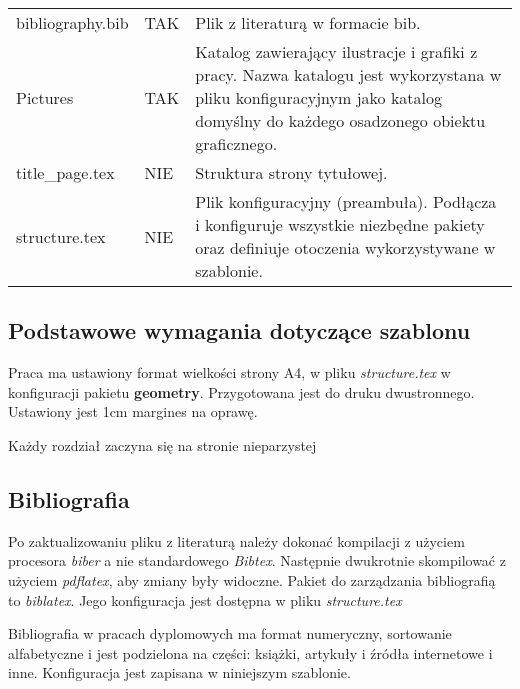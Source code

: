 \begin{table}[h]
\begin{tabular}{p{}|p{} | p{}}
        bibliography.bib     & TAK             & Plik z literaturą w formacie bib.                                                                                                                                           \\
        Pictures             & TAK             & Katalog zawierający ilustracje i grafiki z pracy. Nazwa katalogu jest wykorzystana w pliku konfiguracyjnym jako katalog domyślny do każdego osadzonego obiektu graficznego. \\
        title\_page.tex      & NIE             & Struktura strony tytułowej.                                                                                                                                                 \\
        structure.tex        & NIE             & Plik konfiguracyjny (preambuła). Podłącza i konfiguruje wszystkie niezbędne pakiety oraz definiuje otoczenia wykorzystywane w szablonie.                                    \\
        \bottomrule
    \end{tabular}
    \label{tab:1}
\end{table}

\subsection{Podstawowe wymagania dotyczące szablonu}

Praca ma ustawiony format wielkości strony A4, w pliku {\em structure.tex} w konfiguracji pakietu {\bf geometry}. Przygotowana jest do druku dwustronnego. Ustawiony jest 1cm margines na oprawę.

 Każdy rozdział zaczyna się na stronie nieparzystej

\subsection{Bibliografia}

Po zaktualizowaniu pliku z literaturą należy dokonać kompilacji z użyciem procesora {\em biber} a nie standardowego  {\em Bibtex}. Następnie dwukrotnie skompilować z użyciem {\em pdflatex}, aby zmiany były widoczne. Pakiet do zarządzania bibliografią to {\em biblatex}. Jego konfiguracja jest dostępna w pliku {\em structure.tex}

Bibliografia w pracach dyplomowych ma format numeryczny, sortowanie alfabetyczne i jest podzielona na części: książki, artykuły i źródła internetowe i inne. Konfiguracja jest zapisana w niniejszym szablonie.






